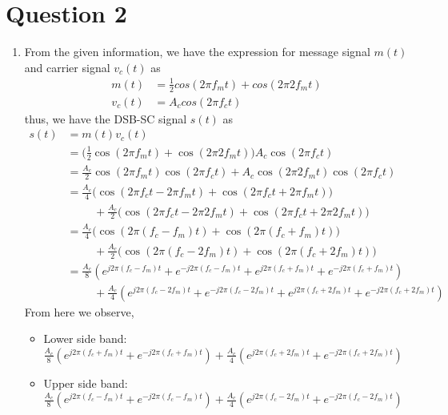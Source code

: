 \documentclass[11pt]{article}
\begin{document}
\section*{Question 2}
\begin{enumerate}[label=(\alph*)]
\item From the given information, we have the expression for message signal $m(t)$ and carrier signal $v_c(t)$ as
    \begin{align*}
    m(t) &= \frac{1}{2} cos(2 \pi f_m t)+cos(2\pi 2 f_m t)\\
    v_c(t) &= A_c cos(2\pi f_c t)
    \end{align*}
thus, we have the DSB-SC signal $s(t)$ as
    \begin{align*}
    s(t) &=m(t)v_c(t) \\
    &= \biggr( \frac{1}{2} \cos(2 \pi f_m t)+\cos(2\pi 2 f_m t)\biggr )A_c \cos(2\pi f_c t)\\
    &=\frac{A_c}{2} \cos(2 \pi f_m t) \cos(2\pi f_c t)+ A_c \cos(2\pi 2 f_m t)\cos(2\pi f_c t)  \\
    &=\frac{A_c}{4}\biggr(\cos(2\pi f_c t - 2\pi f_m t) + \cos(2\pi f_c t + 2\pi f_m t) \biggr)\\ 
    &\hspace{1cm} + \frac{A_c}{2}\biggr( \cos(2\pi f_c t - 2\pi 2f_m t) + \cos(2\pi f_c t + 2\pi 2f_m t) \biggr)\\
    &= \frac{A_c}{4}\biggr(\cos(2\pi (f_c -f_m)t)+ \cos(2\pi (f_c +f_m)t) \biggr)\\
    &\hspace{1cm} + \frac{A_c}{2}\biggr( \cos(2\pi (f_c -2f_m)t)+ \cos(2\pi (f_c +2f_m)t) \biggr)\\
    &= \frac{A_c}{8} (e^{j2\pi (f_c-f_m) t}+e^{-j2\pi (f_c-f_m) t}+e^{j2\pi (f_c+f_m) t}+e^{-j2\pi (f_c+f_m) t})\\
    &\hspace{1cm} +\frac{A_c}{4}(e^{j2\pi (f_c - 2f_m) t}+e^{-j2\pi (f_c - 2f_m) t}+e^{j2\pi (f_c + 2f_m) t}+e^{-j2\pi (f_c+2f_m) t})
    \end{align*}
From here we observe,
\begin{itemize}
    \item %
    Lower side band: $\frac{A_c}{8} (e^{j2\pi (f_c+f_m)t} +  e^{-j2\pi (f_c+f_m)t}) + \frac{A_c}{4}(e^{j2\pi (f_c+2f_m)t} + e^{-j2\pi (f_c+2f_m)t})$
    \item %
    Upper side band: $\frac{A_c}{8} (e^{j2\pi(f_c-f_m)t} +  e^{-j2\pi (f_c-f_m)t}) + \frac{A_c}{4}(e^{j2\pi (f_c-2f_m)t} + e^{-j2\pi (f_c-2f_m)t})$

\end{itemize}
\end{enumerate}
\end{document}
